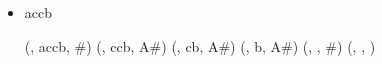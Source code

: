 \documentclass{bschlangaul-aufgabe}
\begin{document}
\begin{enumerate}
\begin{itemize}
\begin{bAntwort}
(, aacbb, \#)   \p
(, acbb,  A\#)  \p
(, cbb,   AA\#) \p
(, bb,    AA\#) \p
(, b,     A\#)  \p
(, \e,    \#)   \p
(, \e,   \e)
\end{bAntwort}

\item accb

\begin{bAntwort}
(, accb, \#)  \p
(, ccb,  A\#) \p
(, cb,   A\#) \p
(, b,    A\#) \p
(, \e,   \#)  \p
(, \e,   \e)
\end{bAntwort}
\end{itemize}
\end{enumerate}
\end{document}
